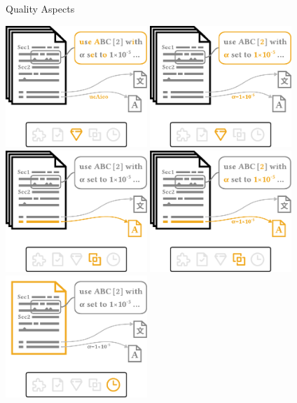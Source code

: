 \documentclass[en,16:9,smallfoot]{sdqbeamer}
\begin{document}
\begin{frame}{Quality Aspects}
\begin{overprint}
            \centering\includegraphics[width=0.4\textwidth]{imgs/schema_asp_2_0}
            \centering\includegraphics[width=0.4\textwidth]{imgs/schema_asp_2_1}
            \centering\includegraphics[width=0.4\textwidth]{imgs/schema_asp_3_0}
            \centering\includegraphics[width=0.4\textwidth]{imgs/schema_asp_3_1}
            \centering\includegraphics[width=0.4\textwidth]{imgs/schema_asp_4_0}

\end{overprint}
\end{frame}
\end{document}

